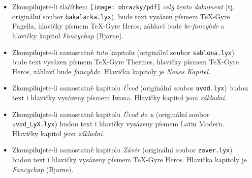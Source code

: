 \begin{itemize}
\item Zkompilujete-li tlačítkem \texttt{[image: obrazky/pdf]} \emph{celý
tento dokument} (tj. originální soubor \texttt{bakalarka.lyx}), bude
text vysázen písmem \TeX{}-Gyre Pagella, hlavičky písmem \TeX{}-Gyre
Heros, záhlaví bude \emph{bc-fancyhdr }a\emph{ }hlavičky kapitol \emph{Fancychap}
(Bjarne).
\item Zkompilujete-li samostatně \emph{tuto }kapitolu (originální soubor
\texttt{sablona.lyx}) bude text vysázen písmem \TeX{}-Gyre Thermes,
hlavičky písmem \TeX{}-Gyre Heros, záhlaví bude \emph{fancyhdr. }Hlavička
kapitoly je \emph{Neues Kapitel}.
\item Zkompilujete-li samostatně\emph{ }kapitolu \emph{Úvod} (originální
soubor \texttt{uvod.lyx}) budou text i hlavičky vysázeny písmem Iwona.\emph{
}Hlavičky kapitol jsou \emph{základní}.
\item Zkompilujete-li samostatně\emph{ }kapitolu \emph{Úvod do \LyX{}u}
(originální soubor \texttt{uvod\_L}\-\texttt{yX.lyx}) budou text
i hlavičky vysázeny písmem Latin Modern.\emph{ }Hlavičky kapitol jsou
\emph{základní}.
\item Zkompilujete-li samostatně\emph{ }kapitolu \emph{Závěr} (originální
soubor \texttt{zaver.lyx}) budou text i hlavičky vysázeny písmem \TeX{}-Gyre
Heros.\emph{ }Hlavička kapitoly je \emph{Fancychap} (Bjarne).
\end{itemize}

